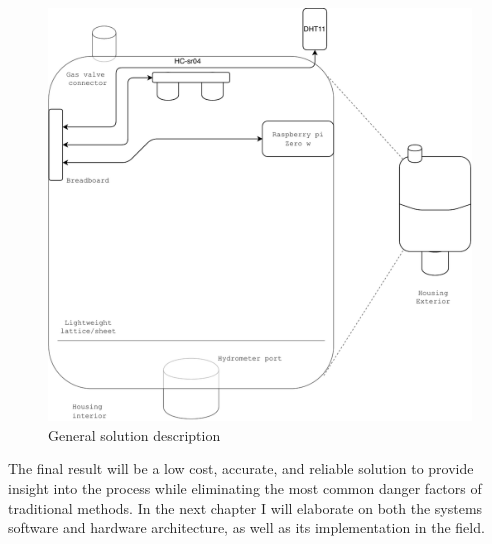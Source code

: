 \documentclass[twoside]{ctuthesis}
\theoremstyle{plain}
\theoremstyle{definition}
\theoremstyle{note}
\begin{document}
\begin{figure}[H]
	\centering
	\includegraphics[scale=0.4]{Housing}
	\caption{General solution description}
\end{figure}

The final result will be a low cost, accurate, and reliable solution to provide insight into the process while eliminating the most common danger factors of traditional methods. In the next chapter I will elaborate on both the systems software and hardware architecture, as well as its implementation in the field.
\end{document}

